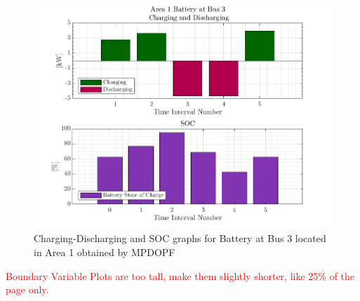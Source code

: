 \documentclass[../../outputs/main.tex]{subfiles}
\begin{document}
\begin{figure}[h!]
    \centering
    \includegraphics[width=\linewidth]{../figures/T5-pv20-batt30-genCost/dopf/BatteryPlots/macroItr_5_genCost_Battery_1_alpha_0.001.png}
    \caption{Charging-Discharging and SOC graphs for Battery at Bus 3 located in Area 1 obtained by MPDOPF}
    \label{fig:batt-plot-dopf-5-20-30-genCost}
\end{figure}

\textcolor{red}{Boundary Variable Plots are too tall, make them slightly shorter, like 25\% of the page only.}
\end{document}
